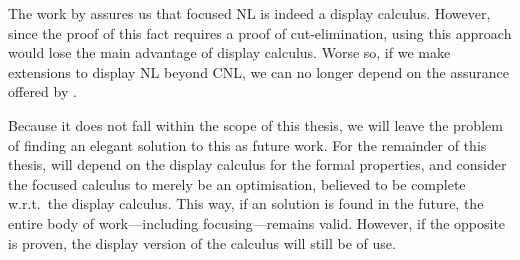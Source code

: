 The work by \citeauthor{bastenhof2011} assures us that focused NL is
indeed a display calculus. However, since the proof of this fact
requires a proof of cut-elimination, using this approach would lose
the main advantage of display calculus. Worse so, if we make
extensions to display NL beyond CNL, we can no longer depend on the
assurance offered by \citeauthor{bastenhof2011}.

Because it does not fall within the scope of this thesis, we will
leave the problem of finding an elegant solution to this as future
work. For the remainder of this thesis, will depend on the display
calculus for the formal properties, and consider the focused calculus
to merely be an optimisation, believed to be complete w.r.t.\ the
display calculus.
This way, if an solution is found in the future, the entire body of
work---including focusing---remains valid. However, if the opposite is
proven, the display version of the calculus will still be of use.

